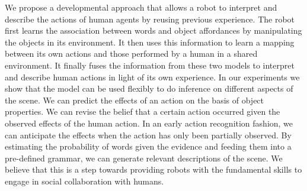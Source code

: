 We propose a developmental approach that allows a robot to interpret and describe the actions of human agents by reusing previous experience.
The robot first learns the association between words and object affordances by manipulating the objects in its environment.
It then uses this information to learn a mapping between its own actions and those performed by a human in a shared environment.
It finally fuses the information from these two models to interpret and describe human actions in light of its own experience.
In our experiments we show that the model can be used flexibly to do inference on different aspects of the scene.
We can predict the effects of an action on the basis of object properties.
We can revise the belief that a certain action occurred given the observed effects of the human action.
In an early action recognition fashion, we can anticipate the effects when the action has only been partially observed.
By estimating the probability of words given the evidence and feeding them into a pre-defined grammar, we can generate relevant descriptions of the scene.
We believe that this is a step towards providing robots with the fundamental skills to engage in social collaboration with humans.

